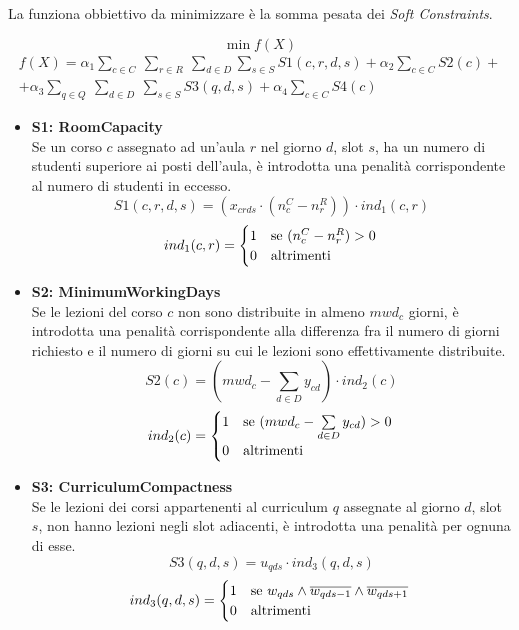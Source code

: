 \documentclass[]{article}
\begin{document}
La funziona obbiettivo da minimizzare è la somma pesata dei \textit{Soft Constraints}.

\[ \min f(X) \]
\[ 
\begin{split}
f(X) =  \alpha_1 \sum_{c \in C} \: \sum_{r \in R} \: \sum_{d \in D} \sum_{s \in S}  S1(c,r,d,s) +  \alpha_2 \sum_{c \in C} S2(c) + \\
+ \alpha_3 \sum_{q \in Q} \: \sum_{d \in D} \: \sum_{s \in S}S3(q,d,s) + \alpha_4 \sum_{c \in C}S4(c)
\end{split}
\]

\begin{itemize}
	\item \textbf{S1: RoomCapacity} \mbox{}\\
	
Se un corso $c$ assegnato ad un'aula $r$ nel giorno $d$, slot $s$, ha un numero di studenti superiore ai posti dell'aula, è introdotta una penalità corrispondente al numero di studenti in eccesso.
	\[ S1(c,r,d,s) = (x_{crds} \cdot (n_c^C - n_r^R)) \cdot ind_1(c,r)  \]
	\[ 
	ind_1(c,r) = 
	    \begin{cases}
			1 & \text{se $(n_c^C  - n_r^R) > 0$}\\
			0 & \text{altrimenti}
		\end{cases}\\
	\]
\end{itemize}


\begin{itemize}
	\item \textbf{S2: MinimumWorkingDays} \mbox{}\\
	
Se le lezioni del corso $c$ non sono distribuite in almeno $mwd_c$ giorni, è introdotta una penalità corrispondente alla differenza fra il numero di giorni richiesto e il numero di giorni su cui le lezioni sono effettivamente distribuite.
	\[ S2(c) = (mwd_c - \sum_{d \in D} y_{cd}) \cdot ind_2(c)  \]
	\[ 
		ind_2(c) = 
		\begin{cases}
			1 & \text{se ($mwd_c - \sum\limits_{d \in D} y_{cd}) > 0$}\\
			0 & \text{altrimenti}
		\end{cases}\\
	\]
\end{itemize}

\begin{itemize}
	\item \textbf{S3: CurriculumCompactness} \mbox{}\\	
	
Se le lezioni dei corsi appartenenti al curriculum $q$ assegnate al giorno $d$, slot $s$,  non hanno lezioni negli slot adiacenti, è introdotta una penalità per ognuna di esse.
	\[ S3(q,d,s) =  u_{qds} \cdot ind_3(q,d,s)  \]
	\[ 
		ind_3(q,d,s) = 
		\begin{cases}
			1 & \text{se $w_{qds}  \land \overline{w_{qds-1}} \land \overline{w_{qds+1}} $} \\
			0 & \text{altrimenti}
		\end{cases}\\
		\]
\end{itemize}
\end{document}
